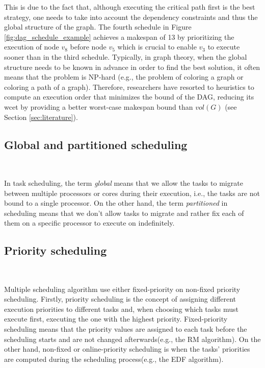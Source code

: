 This is due to the fact that, although executing the critical path first
is the best strategy\cite{zhao2020DAGsched}, 
one needs to take into account the dependency constraints
and thus the global structure of the graph.
The fourth schedule in Figure \ref{fig:dag_schedule_example}
achieves a makespan of 13 by prioritizing the execution of node $v_8$
before node $v_5$ which is crucial to enable $v_3$ to execute sooner
than in the third schedule.
Typically, in graph theory, when the global structure needs to be known 
in advance
in order to find the best solution, it often means that the problem is NP-hard
(e.g., the problem of coloring a graph\cite{book1975richardNPhardColorGraph}
or coloring a path of a graph\cite{ERLEBACH2001ColorPathNPhard}).
Therefore, researchers have resorted to heuristics to compute an execution order
that minimizes the bound of the DAG, reducing its wcet 
by providing a better worst-case makespan bound than $vol(G)$ (see Section \ref{sec:literature}).


\subsection{Global and partitioned scheduling}
~

In task scheduling,
the term \textit{global} means that 
we allow the tasks to migrate between multiple processors or cores
during their execution, i.e., the tasks are
not bound to a single processor.
On the other hand, the term \textit{partitioned}
in scheduling means that we don't allow tasks to migrate 
and rather fix each of them on a specific processor to execute on
indefinitely.

\subsection{Priority scheduling}
~

Multiple scheduling algorithm use either fixed-priority 
on non-fixed priority scheduling.
Firstly, priority scheduling is the concept 
of assigning different execution priorities 
to different tasks and, when choosing which tasks 
must execute first, executing the one with the highest priority.
Fixed-priority scheduling means that the priority values
are assigned to each task before the scheduling starts
and are not changed afterwards(e.g., the RM algorithm\cite{liu1973scheduling}).
On the other hand, non-fixed or online-priority scheduling
is when the tasks' priorities are computed during 
the scheduling process(e.g., the EDF algorithm\cite{liu1973scheduling}).

